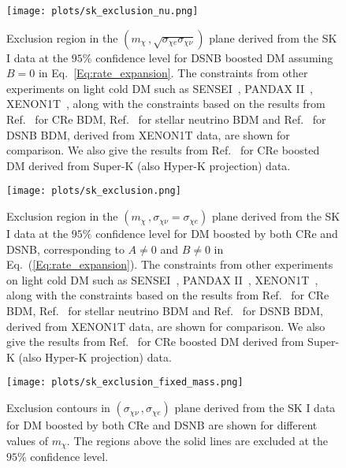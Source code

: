 \documentclass[11pt,prd,twocolumn,nofootinbib,reprint,superscriptaddress,longbibliography,colorlinks=true,citecolor=blue]{revtex4-1}
\begin{document}
\begin{figure}
\centering
\texttt{[image: plots/sk\_exclusion\_nu.png]}
\caption{Exclusion region in the $(m_\chi\,,\sqrt{\sigma_{\chi e}\sigma_{\chi\nu}})$ plane derived from the SK I data at the $95\%$ confidence level for DSNB boosted DM assuming $B = 0$ in Eq.~\ref{Eq:rate_expansion}.  The constraints from other experiments on light cold DM such as SENSEI~\cite{SENSEI:2020dpa}, PANDAX II~\cite{PandaX-II:2021nsg}, XENON1T~\cite{XENON:2019gfn}, along with the constraints based on the results from Ref.~\cite{Jho:2020sku} for CRe BDM, Ref.~\cite{Jho:2021rmn} for stellar neutrino BDM and Ref.~\cite{Das:2021lcr} for DSNB BDM, derived from XENON1T data, are shown for comparison. We also give the results from Ref.~\cite{Cappiello:2019qsw} for CRe boosted DM derived from Super-K (also Hyper-K projection) data. }
\protect\label{Fig:chisqr_sk_12}
\end{figure}


\begin{figure}
\centering
\texttt{[image: plots/sk\_exclusion.png]}
\caption{Exclusion region in the $(m_\chi\,,\sigma_{\chi \nu} = \sigma_{\chi e})$ plane derived from the SK I data at the $95\%$ confidence level for DM boosted by both CRe and DSNB, corresponding to $A \neq 0$ and $B \neq 0$ in Eq.~(\ref{Eq:rate_expansion}). The constraints from other experiments on light cold DM such as SENSEI~\cite{SENSEI:2020dpa}, PANDAX II~\cite{PandaX-II:2021nsg}, XENON1T~\cite{XENON:2019gfn}, along with the constraints based on the results from Ref.~\cite{Jho:2020sku} for CRe BDM, Ref.~\cite{Jho:2021rmn} for stellar neutrino BDM and Ref.~\cite{Das:2021lcr} for DSNB BDM, derived from XENON1T data, are shown for comparison. We also give the results from Ref.~\cite{Cappiello:2019qsw} for CRe boosted DM derived from Super-K (also Hyper-K projection) data. }
\protect\label{Fig:chisqr_sk_2}
\end{figure}

\begin{figure}
\centering
\texttt{[image: plots/sk\_exclusion\_fixed\_mass.png]}
\caption{Exclusion contours in $(\sigma_{\chi \nu}\,, \sigma_{\chi e})$ plane derived from the SK I data for DM boosted by both CRe and DSNB are shown for different values of $m_\chi$. The regions above the solid lines are excluded at the $95\%$ confidence level.}
\protect\label{Fig:chisqr_sk_22}
\end{figure}
\end{document}
